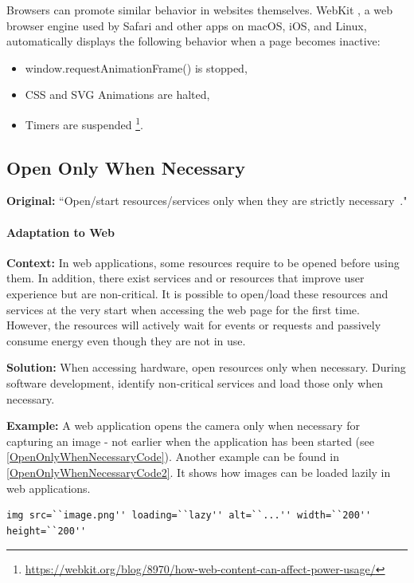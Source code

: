 Browsers can promote similar behavior in websites themselves. WebKit \cite{webkit-website}, a web browser engine used by Safari and other apps on macOS, iOS, and Linux, automatically displays the following behavior when a page becomes inactive: 
\begin{itemize}
    \item window.requestAnimationFrame() is stopped,
    \item CSS and SVG Animations are halted,
    \item Timers are suspended \footnote{\url{https://webkit.org/blog/8970/how-web-content-can-affect-power-usage/}}.
\end{itemize}


\subsection{Open Only When Necessary} \label{sec:patterns-OpenOnlyWhenNecessary}
\textbf{Original:} ``Open/start resources/services only when they are strictly necessary~\cite{cruz2019catalog}."

\paragraph{Adaptation to Web}\mbox{}

\textbf{Context:} In web applications, some resources require to be opened before using them. In addition, there exist services and or resources that improve user experience but are non-critical. It is possible to open/load these resources and services at the very start when accessing the web page for the first time. However, the resources will actively wait for events or requests and passively consume energy even though they are not in use.

\textbf{Solution:} When accessing hardware, open resources only when necessary. During software development, identify non-critical services and load those only when necessary.

\textbf{Example:} A web application opens the camera only when necessary for capturing an image - not earlier when the application has been started (see \autoref{OpenOnlyWhenNecessaryCode}). Another example can be found in \autoref{OpenOnlyWhenNecessaryCode2}. It shows how images can be loaded lazily in web applications.

\begin{minipage}{\linewidth}
    \begin{lstlisting}[caption={Code snippet showing the usage of the loading attribute to lazy-load images \cite{lazy-loading-code-example}}, label={OpenOnlyWhenNecessaryCode2}]
img src=``image.png'' loading=``lazy'' alt=``...'' width=``200'' height=``200''
\end{lstlisting}
\end{minipage}

